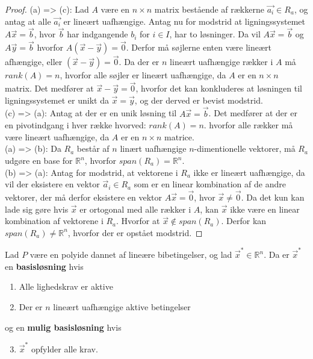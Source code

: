 \begin{proof}
(a) => (c): Lad $A$ være en $n \times n$ matrix bestående af rækkerne $\vec{a_i} \in R_a$, og antag at alle $\vec{a_i}$ er lineært uafhængige. 
Antag nu for modstrid at ligningssystemet $A\vec{x} = \vec{b}$, hvor $\vec{b}$ har indgangende $b_i$ for $i \in I$, har to løsninger. 
Da vil $A \vec{x} = \vec{b}$ og $A \vec{y} = \vec{b}$ hvorfor $A(\vec{x}-\vec{y}) = \vec{0}$.
Derfor må søjlerne enten være lineært afhængige, eller $(\vec{x}-\vec{y})= \vec{0}$.
Da der er $n$ lineært uafhængige rækker i $A$ må $rank(A) = n$, hvorfor alle søjler er lineært uafhængige, da $A$ er en $n \times n$ matrix.
Det medfører at $\vec{x}-\vec{y} = \vec{0}$, hvorfor det kan konkluderes at løsningen til ligningssystemet er unikt da $ \vec{x}=\vec{y}$, og der derved er bevist modstrid.
\\(c) => (a): Antag at der er en unik løsning til $A\vec{x} =\vec{b}$. Det medfører at der er en pivotindgang i hver række hvorved: $rank(A) = n$. hvorfor alle rækker må være lineært uafhængige, da $A$ er en $n \times n$ matrice. %
\\ (a) => (b): Da $R_a$ består af $n$ linært uafhængige $n$-dimentionelle vektorer, må $R_a$ udgøre en base for $\mathds{R}^n$, hvorfor $span(R_a) = \mathds{R}^n$.
\\ (b) => (a): Antag for modstrid, at vektorene i $R_a$ ikke er lineært uafhængige, da vil der eksistere en vektor $\vec{a}_i \in R_a$ som er en linear kombination af de andre vektorer, der må derfor eksistere en vektor $A\vec{x} = \vec{0}$, hvor $\vec{x} \neq \vec{0}$.
Da det kun kan lade sig gøre hvis $\vec{x}$ er ortogonal med alle rækker i $A$, kan $\vec{x}$ ikke være en linear kombination af vektorene i $R_a$.
Hvorfor at $\vec{x} \notin span(R_a)$.
Derfor kan $span(R_a) \neq \mathds{R}^n$, hvorfor der er opstået modstrid.
\end{proof}

\begin{defn}[Basisløsning]
Lad $P$ være en polyide dannet af lineære bibetingelser, og lad $\vec{x}^*\in \mathds{R}^n$. Da er $\vec{x}^*$ en \textbf{basisløsning} hvis
\begin{enumerate}[label=(\alph*)]
\item Alle lighedskrav er aktive
\item Der er $n$ lineært uafhængige aktive betingelser
\end{enumerate}
og en \textbf{mulig basisløsning} hvis
\begin{enumerate}[label=(\alph*)]
\setcounter{enumi}{2}
\item $\vec{x}^*$ opfylder alle krav.
\end{enumerate}
\label{def:basislosning}
\end{defn}

